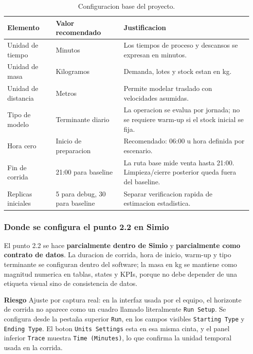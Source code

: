 \documentclass[11pt]{article}
\newcommand{\simio}[1]{\texttt{#1}}
\newcommand{\risk}{\textcolor{rojoriesgo}{\textbf{Riesgo}}}
\begin{document}
\begin{table}[H]
\centering
\caption{Configuracion base del proyecto.}
\begin{tabularx}{\textwidth}{L{4.2cm}L{4.0cm}Y}
\toprule
{}
\color{white}Elemento & \color{white}Valor recomendado & \color{white}Justificacion \\
\midrule
Unidad de tiempo & Minutos & Los tiempos de proceso y descansos se expresan en minutos. \\
Unidad de masa & Kilogramos & Demanda, lotes y stock estan en kg. \\
Unidad de distancia & Metros & Permite modelar traslado con velocidades asumidas. \\
Tipo de modelo & Terminante diario & La operacion se evalua por jornada; no se requiere warm-up si el stock inicial se fija. \\
Hora cero & Inicio de preparacion & Recomendado: 06:00 u hora definida por escenario. \\
Fin de corrida & 21:00 para baseline & La ruta base mide venta hasta 21:00. Limpieza/cierre posterior queda fuera del baseline. \\
Replicas iniciales & 5 para debug, 30 para baseline & Separar verificacion rapida de estimacion estadistica. \\
\bottomrule
\end{tabularx}
\end{table}

\subsubsection{Donde se configura el punto 2.2 en Simio}

El punto 2.2 se hace \textbf{parcialmente dentro de Simio} y \textbf{parcialmente como contrato de datos}. La duracion de corrida, hora de inicio, warm-up y tipo terminante se configuran dentro del software; la masa en kg se mantiene como magnitud numerica en tablas, states y KPIs, porque no debe depender de una etiqueta visual sino de consistencia de datos.

\risk{} Ajuste por captura real: en la interfaz usada por el equipo, el horizonte de corrida no aparece como un cuadro llamado literalmente \simio{Run Setup}. Se configura desde la pestaña superior \simio{Run}, en los campos visibles \simio{Starting Type} y \simio{Ending Type}. El boton \simio{Units Settings} esta en esa misma cinta, y el panel inferior \simio{Trace} muestra \simio{Time (Minutes)}, lo que confirma la unidad temporal usada en la corrida.
\end{document}
